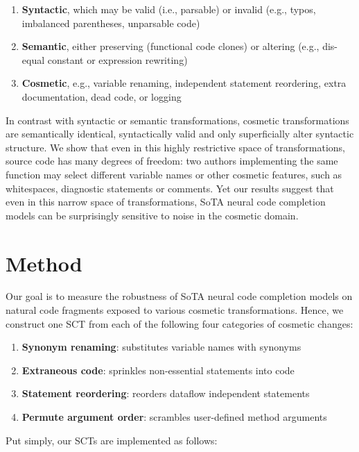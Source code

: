 \documentclass[usenames,dvipsnames]{article} %
\begin{document}
  \begin{enumerate}[itemsep=1ex]
    \item \textbf{Syntactic}, which may be valid (i.e., parsable) or invalid (e.g., typos, imbalanced parentheses, unparsable code)
    \item \textbf{Semantic}, either preserving (functional code clones) or altering (e.g., dis-equal constant or expression rewriting)
    \item \textbf{Cosmetic}, e.g., variable renaming, independent statement reordering, extra documentation, dead code, or logging
  \end{enumerate}

  In contrast with syntactic or semantic transformations, cosmetic transformations are semantically identical, syntactically valid and only superficially alter syntactic structure. We show that even in this highly restrictive space of transformations, source code has many degrees of freedom: two authors implementing the same function may select different variable names or other cosmetic features, such as whitespaces, diagnostic statements or comments.  Yet our results suggest that even in this narrow space of transformations, SoTA neural code completion models can be surprisingly sensitive to noise in the cosmetic domain.

  \section{Method}\label{sec:method}

  Our goal is to measure the robustness of SoTA neural code completion models on natural code fragments exposed to various cosmetic transformations. Hence, we construct one SCT from each of the following four categories of cosmetic changes:

  \begin{enumerate}[itemsep=1ex]
    \item \textbf{Synonym renaming}: substitutes variable names with synonyms
    \item \textbf{Extraneous code}: sprinkles non-essential statements into code
    \item \textbf{Statement reordering}: reorders dataflow independent statements
    \item \textbf{Permute argument order}: scrambles user-defined method arguments
  \end{enumerate}

  Put simply, our SCTs are implemented as follows:
\end{document}
